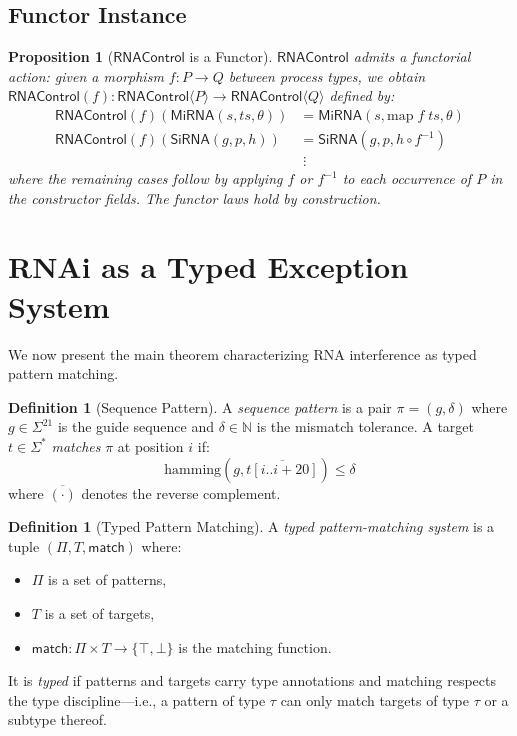 \documentclass[12pt,a4paper]{article}
\newtheorem{proposition}[theorem]{Proposition}
\theoremstyle{definition}
\newtheorem{definition}[theorem]{Definition}
\newcommand{\RNAType}{\mathsf{RNAControl}}
\begin{document}
\subsection{Functor Instance}

\begin{proposition}[$\RNAType$ is a Functor]\label{prop:rnacontrol-functor}
$\RNAType$ admits a functorial action: given a morphism $f : P \to Q$
between process types, we obtain
$\RNAType(f) : \RNAType\langle P\rangle \to \RNAType\langle Q\rangle$
defined by:
\begin{align*}
  \RNAType(f)(\mathsf{MiRNA}(s, ts, \theta)) &=
    \mathsf{MiRNA}(s, \mathrm{map}\;f\;ts, \theta) \\
  \RNAType(f)(\mathsf{SiRNA}(g, p, h)) &=
    \mathsf{SiRNA}(g, p, h \circ f^{-1}) \\
  &\;\vdots
\end{align*}
where the remaining cases follow by applying $f$ or $f^{-1}$ to
each occurrence of $P$ in the constructor fields.  The functor laws
hold by construction.
\end{proposition}

\section{RNAi as a Typed Exception System}\label{sec:rnai-typed}

We now present the main theorem characterizing RNA interference as
typed pattern matching.

\begin{definition}[Sequence Pattern]\label{def:seq-pattern}
A \emph{sequence pattern} is a pair $\pi = (g, \delta)$ where
$g \in \Sigma^{21}$ is the guide sequence and $\delta \in \mathbb{N}$
is the mismatch tolerance.  A target $t \in \Sigma^*$ \emph{matches}
$\pi$ at position $i$ if:
\[
  \mathrm{hamming}(g, \overline{t[i..i{+}20]}) \leq \delta
\]
where $\overline{(\cdot)}$ denotes the reverse complement.
\end{definition}

\begin{definition}[Typed Pattern Matching]
A \emph{typed pattern-matching system} is a tuple
$(\Pi, T, \mathsf{match})$ where:
\begin{itemize}
  \item $\Pi$ is a set of patterns,
  \item $T$ is a set of targets,
  \item $\mathsf{match} : \Pi \times T \to \{\top, \bot\}$ is the
    matching function.
\end{itemize}
It is \emph{typed} if patterns and targets carry type annotations
and matching respects the type discipline---i.e., a pattern of type
$\tau$ can only match targets of type $\tau$ or a subtype thereof.
\end{definition}
\end{document}

